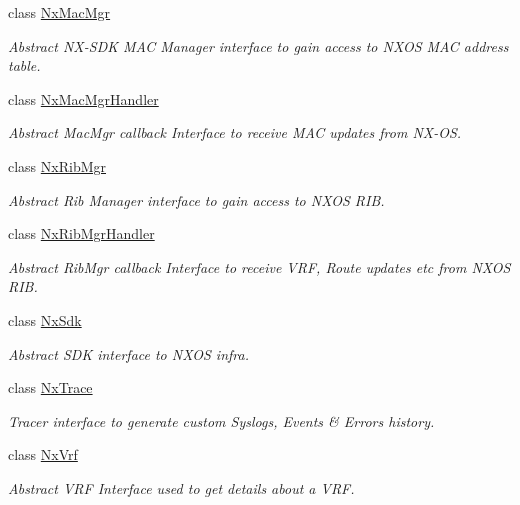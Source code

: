 \begin{DoxyCompactItemize}
class \mbox{\hyperlink{classnxos_1_1_nx_mac_mgr}{Nx\+Mac\+Mgr}}
\begin{DoxyCompactList}\small\item\em Abstract N\+X-\/\+S\+DK M\+AC Manager interface to gain access to N\+X\+OS M\+AC address table. \end{DoxyCompactList}\item 
class \mbox{\hyperlink{classnxos_1_1_nx_mac_mgr_handler}{Nx\+Mac\+Mgr\+Handler}}
\begin{DoxyCompactList}\small\item\em Abstract Mac\+Mgr callback Interface to receive M\+AC updates from N\+X-\/\+OS. \end{DoxyCompactList}\item 
class \mbox{\hyperlink{classnxos_1_1_nx_rib_mgr}{Nx\+Rib\+Mgr}}
\begin{DoxyCompactList}\small\item\em Abstract Rib Manager interface to gain access to N\+X\+OS R\+IB. \end{DoxyCompactList}\item 
class \mbox{\hyperlink{classnxos_1_1_nx_rib_mgr_handler}{Nx\+Rib\+Mgr\+Handler}}
\begin{DoxyCompactList}\small\item\em Abstract Rib\+Mgr callback Interface to receive V\+RF, Route updates etc from N\+X\+OS R\+IB. \end{DoxyCompactList}\item 
class \mbox{\hyperlink{classnxos_1_1_nx_sdk}{Nx\+Sdk}}
\begin{DoxyCompactList}\small\item\em Abstract S\+DK interface to N\+X\+OS infra. \end{DoxyCompactList}\item 
class \mbox{\hyperlink{classnxos_1_1_nx_trace}{Nx\+Trace}}
\begin{DoxyCompactList}\small\item\em Tracer interface to generate custom Syslogs, Events \& Errors history. \end{DoxyCompactList}\item 
class \mbox{\hyperlink{classnxos_1_1_nx_vrf}{Nx\+Vrf}}
\begin{DoxyCompactList}\small\item\em Abstract V\+RF Interface used to get details about a V\+RF. \end{DoxyCompactList}\end{DoxyCompactItemize}
